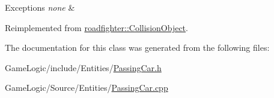 \begin{DoxyExceptions}{Exceptions}
{\em none} & \\
\hline
\end{DoxyExceptions}


Reimplemented from \hyperlink{classroadfighter_1_1CollisionObject_aa793e1b9943ee90bbb4129ddd06b9be7}{roadfighter\+::\+Collision\+Object}.



The documentation for this class was generated from the following files\+:\begin{DoxyCompactItemize}
\item 
Game\+Logic/include/\+Entities/\hyperlink{PassingCar_8h}{Passing\+Car.\+h}\item 
Game\+Logic/\+Source/\+Entities/\hyperlink{PassingCar_8cpp}{Passing\+Car.\+cpp}\end{DoxyCompactItemize}
